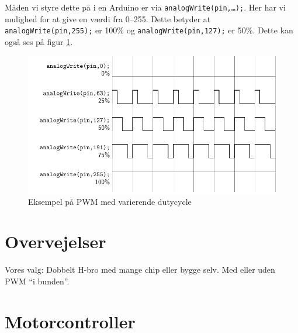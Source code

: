 \documentclass[a4paper,oneside,article,danish,table]{memoir}
\begin{document}
Måden vi styre dette på i en Arduino er via \texttt{analogWrite(pin,\dots);}. Her har vi mulighed for at give en værdi fra 0--255. Dette betyder at \texttt{analogWrite(pin,255);} er 100\% og \texttt{analogWrite(pin,127);} er 50\%. Dette kan også ses på figur \ref{fig:pwm}.
\begin{figure}[htbp]
  \centering
  \includegraphics[width=\textwidth]{pictures/pwm.pdf}
  \caption{Eksempel på PWM med varierende dutycycle}
  \label{fig:pwm}
\end{figure}

\section{Overvejelser}
Vores valg: Dobbelt H-bro med mange chip eller bygge selv. Med eller uden PWM “i bunden”.
\section{Motorcontroller}
\end{document}
